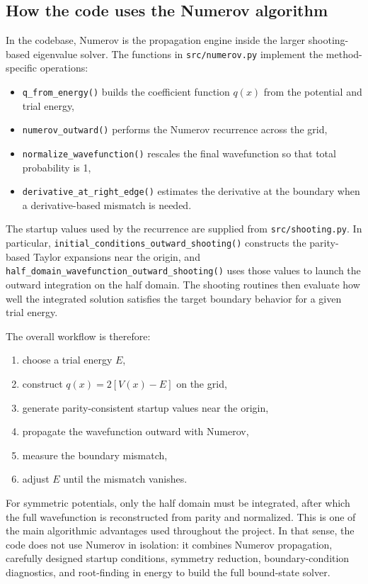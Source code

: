 \documentclass[11pt]{article}
\begin{document}
    \subsection{How the code uses the Numerov algorithm}

    In the codebase, Numerov is the propagation engine inside the larger shooting-based eigenvalue solver. The functions in \texttt{src/numerov.py} implement the method-specific operations:
    \begin{itemize}
        \item \texttt{q\_from\_energy()} builds the coefficient function $q(x)$ from the potential and trial energy,
        \item \texttt{numerov\_outward()} performs the Numerov recurrence across the grid,
        \item \texttt{normalize\_wavefunction()} rescales the final wavefunction so that total probability is 1,
        \item \texttt{derivative\_at\_right\_edge()} estimates the derivative at the boundary when a derivative-based mismatch is needed.
    \end{itemize}

    The startup values used by the recurrence are supplied from \texttt{src/shooting.py}. In particular, \texttt{initial\_conditions\_outward\_shooting()} constructs the parity-based Taylor expansions near the origin, and \texttt{half\_domain\_wavefunction\_outward\_shooting()} uses those values to launch the outward integration on the half domain. The shooting routines then evaluate how well the integrated solution satisfies the target boundary behavior for a given trial energy.

    The overall workflow is therefore:
    \begin{enumerate}
        \item choose a trial energy $E$,
        \item construct $q(x)=2[V(x)-E]$ on the grid,
        \item generate parity-consistent startup values near the origin,
        \item propagate the wavefunction outward with Numerov,
        \item measure the boundary mismatch,
        \item adjust $E$ until the mismatch vanishes.
    \end{enumerate}

    For symmetric potentials, only the half domain must be integrated, after which the full wavefunction is reconstructed from parity and normalized. This is one of the main algorithmic advantages used throughout the project. In that sense, the code does not use Numerov in isolation: it combines Numerov propagation, carefully designed startup conditions, symmetry reduction, boundary-condition diagnostics, and root-finding in energy to build the full bound-state solver.
\end{document}
